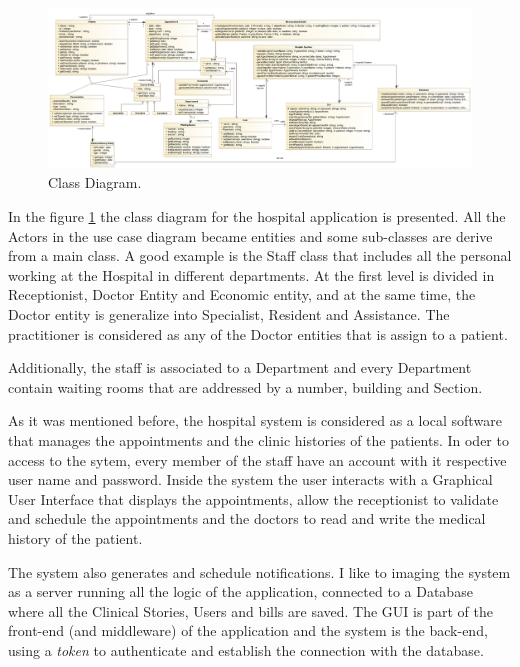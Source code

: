 \documentclass{article}
\begin{document}
            \begin{figure}[H]
                \centering 
                \includegraphics[width=1\linewidth]{./img/class2.png}
                \caption{Class Diagram.}
                \label{fig:class}
            \end{figure}

            In the figure \ref{fig:class} the class diagram for the hospital application is presented. All the Actors in the use case diagram became entities and some sub-classes are derive from a main class.
            A good example is the Staff class that includes all the personal working at the Hospital in different departments. At the first level is divided in Receptionist, Doctor Entity and Economic entity, and at the same time,
            the Doctor entity is generalize into Specialist, Resident and Assistance. The practitioner is considered as any of the Doctor entities that is assign to a patient.

            Additionally, the staff is associated to a Department and every Department contain waiting rooms that are addressed by a number, building and Section.

            As it was mentioned before, the hospital system is considered as a local software that manages the appointments and the clinic histories of the patients. In oder to access to the sytem, every member of the staff have an account with
            it respective user name and password. Inside the system the user interacts with a Graphical User Interface that displays the appointments, allow the receptionist to validate and schedule the appointments and the doctors to read and write the
            medical history of the patient. 

            The system also generates and schedule notifications. I like to imaging the system as a server running all the logic of the application, connected to a Database where all the Clinical Stories, Users and bills are saved.
            The GUI is part of the front-end (and middleware) of the application and the system is the back-end, using a \textit{token} to authenticate and establish the connection with the database.
            
\end{document}
